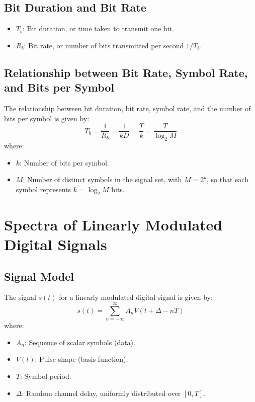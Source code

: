 \documentclass[10pt]{article}
\begin{document}
\subsection{Bit Duration and Bit Rate}
\begin{itemize}
    \item \( T_b \): Bit duration, or time taken to transmit one bit.
    \item \( R_b \): Bit rate, or number of bits transmitted per second $1/T_b$.
\end{itemize}

\subsection{Relationship between Bit Rate, Symbol Rate, and Bits per Symbol}
The relationship between bit duration, bit rate, symbol rate, and the number of bits per symbol is given by:
\[
T_b = \frac{1}{R_b} = \frac{1}{kD} = \frac{T}{k} = \frac{T}{\log_2 M}
\]
where:
\begin{itemize}
    \item \( k \): Number of bits per symbol.
    \item \( M \): Number of distinct symbols in the signal set, with \( M = 2^k \), so that each symbol represents \( k = \log_2 M \) bits.
\end{itemize}

\section{Spectra of Linearly Modulated Digital Signals}

\subsection{Signal Model}
The signal \( s(t) \) for a linearly modulated digital signal is given by:
\[
s(t) = \sum_{n=-\infty}^{\infty} A_n V(t + \Delta - nT)
\]
where:
\begin{itemize}
    \item \( A_n \): Sequence of scalar symbols (data).
    \item \( V(t) \): Pulse shape (basis function).
    \item \( T \): Symbol period.
    \item \( \Delta \): Random channel delay, uniformly distributed over \( [0, T] \).
\end{itemize}
\end{document}
